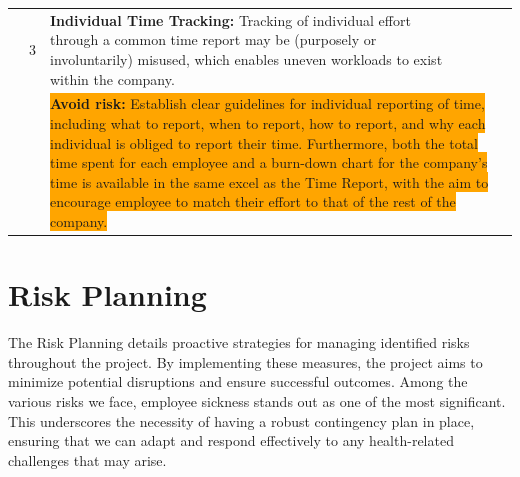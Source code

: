 \begin{flushleft}
\begin{tabular}{|p{1cm}|c|p{5cm}|>{\centering\arraybackslash}p{2cm}|>{\centering\arraybackslash}p{2cm}|>{\centering\arraybackslash}p{2cm}|}
        \cline{2-6} 
        & 3
        & \textbf{Individual Time Tracking:} Tracking of individual effort through a common time report may be (purposely or involuntarily) misused, which enables uneven workloads to exist within the company. 
        & 3 & 3 & 9 \\
        \cline{3-6} 
        & & \multicolumn{4}{|p{12.5cm}|}{\colorbox{orange}{\parbox{12.5cm}{\textbf{Avoid risk:} Establish clear guidelines for individual reporting of time, including what to report, when to report, how to report, and why each individual is obliged to report their time. Furthermore, both the total time spent for each employee and a burn-down chart for the company's time is available in the same excel as the Time Report, with the aim to encourage employee to match their effort to that of the rest of the company.}}} \\
        \cline{2-6} 
        \hline
    \end{tabular}
    \end{flushleft}

\newpage
\section{Risk Planning}

The Risk Planning details proactive strategies for managing identified risks throughout the project. By implementing these measures, the project aims to minimize potential disruptions and ensure successful outcomes. Among the various risks we face, employee sickness stands out as one of the most significant. This underscores the necessity of having a robust contingency plan in place, ensuring that we can adapt and respond effectively to any health-related challenges that may arise.

